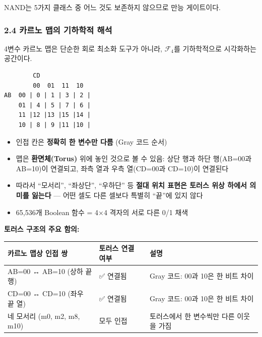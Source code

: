 \documentclass[
]{article}
\newcounter{none} %
\providecommand{\tightlist}{%
  \setlength{\itemsep}{0pt}\setlength{\parskip}{0pt}}
\begin{document}
NAND는 5가지 클래스 중 어느 것도 보존하지 않으므로 만능 게이트이다.

\subsubsection{2.4 카르노 맵의 기하학적
해석}\label{uxce74uxb974uxb178-uxb9f5uxc758-uxae30uxd558uxd559uxc801-uxd574uxc11d}

4변수 카르노 맵은 단순한 회로 최소화 도구가 아니라, \(\mathcal{F}_4\)를
기하학적으로 시각화하는 공간이다.

\begin{verbatim}
        CD
        00  01  11  10
AB  00 | 0 | 1 | 3 | 2 |
    01 | 4 | 5 | 7 | 6 |
    11 |12 |13 |15 |14 |
    10 | 8 | 9 |11 |10 |
\end{verbatim}

\begin{itemize}
\tightlist
\item
  인접 칸은 \textbf{정확히 한 변수만 다름} (Gray 코드 순서)
\item
  맵은 \textbf{환면체(Torus)} 위에 놓인 것으로 볼 수 있음: 상단 행과
  하단 행(AB=00과 AB=10)이 연결되고, 좌측 열과 우측 열(CD=00과 CD=10)이
  연결된다
\item
  따라서 ``모서리'', ``좌상단'', ``우하단'' 등 \textbf{절대 위치 표현은
  토러스 위상 하에서 의미를 잃는다} --- 어떤 셀도 다른 셀보다 특별히
  ``끝''에 있지 않다
\item
  65,536개 Boolean 함수 = 4×4 격자의 서로 다른 0/1 채색
\end{itemize}

\textbf{토러스 구조의 주요 함의:}

{\def\LTcaptype{none} %
\begin{longtable}[]{@{}
  >{\raggedright\arraybackslash}p{}
  >{\raggedright\arraybackslash}p{}
  >{\raggedright\arraybackslash}p{}@{}}
\toprule\noalign{}
\begin{minipage}[b]{\linewidth}\raggedright
카르노 맵상 인접 쌍
\end{minipage} & \begin{minipage}[b]{\linewidth}\raggedright
토러스 연결 여부
\end{minipage} & \begin{minipage}[b]{\linewidth}\raggedright
설명
\end{minipage} \\
\midrule\noalign{}
\endhead
\bottomrule\noalign{}
\endlastfoot
AB=00 ↔ AB=10 (상하 끝 행) & ✅ 연결됨 & Gray 코드: 00과 10은 한 비트
차이 \\
CD=00 ↔ CD=10 (좌우 끝 열) & ✅ 연결됨 & Gray 코드: 00과 10은 한 비트
차이 \\
네 모서리 (m0, m2, m8, m10) & 모두 인접 & 토러스에서 한 변수씩만 다른
이웃을 가짐 \\
\end{longtable}
}
\end{document}
